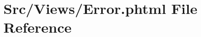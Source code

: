 \hypertarget{_error_8phtml}{}\section{Src/\+Views/\+Error.phtml File Reference}
\label{_error_8phtml}
